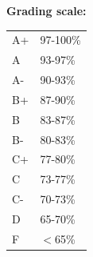 \documentclass[11pt]{article}
\begin{document}
\pagebreak

\textbf{Grading scale:} \\

\begin{tabular}{ | p{2cm} p{2cm} | }
	\hline
	A+		& 97-100\% \\
	A		& 93-97\% \\
	A-		& 90-93\% \\
	B+		& 87-90\% \\
	B		& 83-87\% \\
	B-		& 80-83\% \\
	C+		& 77-80\% \\
	C		& 73-77\% \\
	C-		& 70-73\% \\
	D		& 65-70\% \\
	F		& $<$65\% \\
	\hline
\end{tabular}
\end{document}
